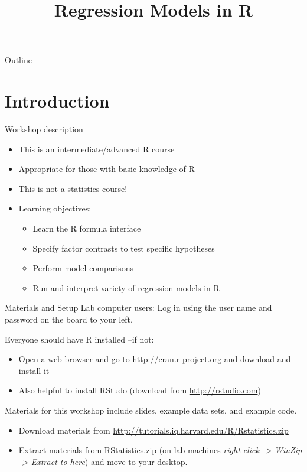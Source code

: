 \documentclass[table,smaller]{beamer}
\author{}
\date{}
\title{Regression Models in R}
\begin{document}
\maketitle
\begin{frame}{Outline}
\tableofcontents
\end{frame}



\section{Introduction}
\label{sec-1}

\begin{frame}[label=sec-1-1]{Workshop description}
\begin{itemize}
\item This is an intermediate/advanced R course
\item Appropriate for those with basic knowledge of R
\item This is not a statistics course!
\item Learning objectives:
\begin{itemize}
\item Learn the R formula interface
\item Specify factor contrasts to test specific hypotheses
\item Perform model comparisons
\item Run and interpret variety of regression models in R
\end{itemize}
\end{itemize}
\end{frame}

\begin{frame}[label=sec-1-2]{Materials and Setup}
Lab computer users: Log in using the user name and password on the board to your left.

Everyone should have R installed --if not:

\begin{itemize}
\item Open a web browser and go to \url{http://cran.r-project.org} and download and install it
\item Also helpful to install RStudo (download from \url{http://rstudio.com})
\end{itemize}

Materials for this workshop include slides, example data sets, and example code.

\begin{itemize}
\item Download materials from \url{http://tutorials.iq.harvard.edu/R/Rstatistics.zip}
\item Extract materials from RStatistics.zip (on lab machines \emph{right-click -> WinZip -> Extract to here}) and move to your desktop.
\end{itemize}
\end{frame}
\end{document}

